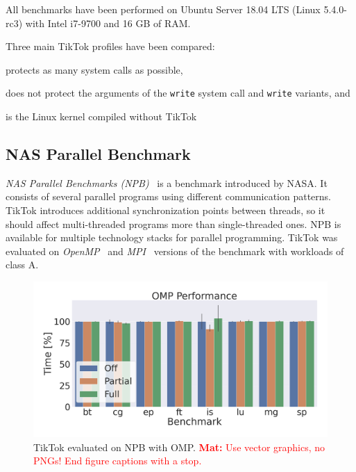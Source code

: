 \documentclass[conference]{IEEEtran}
\newcommand{\mat}[1]{\textcolor{red}{\textbf{Mat:} #1}}
\newcommand{\sysname}{TikTok}
\begin{document}
All benchmarks have been performed on Ubuntu Server 18.04 LTS (Linux 5.4.0-rc3)
with Intel i7-9700 and 16 GB of RAM.

Three main \sysname{} profiles have been compared:
\begin{LaTeXdescription}
  \item[\sysname{} On] protects as many system calls as possible,
  \item[\sysname{} Partial] does not protect the arguments of the \texttt{write}
system call and \texttt{write} variants, and
  \item[\sysname{} Off] is the Linux kernel compiled without \sysname{}  
\end{LaTeXdescription}

\subsection{NAS Parallel Benchmark}
\label{subsec:npb}

\emph{NAS Parallel Benchmarks (NPB)}~\cite{npb} is a benchmark introduced by
NASA. It consists of several parallel programs using different communication
patterns. \sysname{} introduces additional synchronization points between
threads, so it should affect multi-threaded programs more than single-threaded
ones. NPB is available for multiple technology stacks for parallel programming.
\sysname{} was evaluated on \emph{OpenMP}~\cite{dagum1998openmp} and
\emph{MPI}~\cite{snir1998mpi} versions of the benchmark with workloads of class
A.

\begin{figure}[]
  \centering
  \includegraphics[width=\linewidth]{graphs/omp.png}
  \caption{\sysname{} evaluated on NPB with OMP.
\mat{Use vector graphics, no PNGs! End figure captions with a stop.}
}
  \label{fig:npbomp}
\end{figure}
\end{document}
